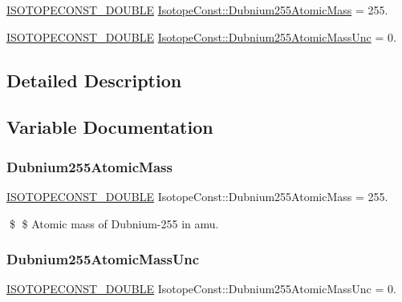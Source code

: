 \begin{DoxyCompactItemize}
\item 
\mbox{\hyperlink{group___isotope_const-_macros_ga8f45a7272ce02c0b4c65c44636ed719a}{I\+S\+O\+T\+O\+P\+E\+C\+O\+N\+S\+T\+\_\+\+D\+O\+U\+B\+LE}} \mbox{\hyperlink{group___isotope_const-_dubnium-_db255_ga06bb51edcc201367d1c122cf9b1c7780}{Isotope\+Const\+::\+Dubnium255\+Atomic\+Mass}} = 255.
\item 
\mbox{\hyperlink{group___isotope_const-_macros_ga8f45a7272ce02c0b4c65c44636ed719a}{I\+S\+O\+T\+O\+P\+E\+C\+O\+N\+S\+T\+\_\+\+D\+O\+U\+B\+LE}} \mbox{\hyperlink{group___isotope_const-_dubnium-_db255_gafa9da578604ad802ebca0f6a1be6fd31}{Isotope\+Const\+::\+Dubnium255\+Atomic\+Mass\+Unc}} = 0.
\end{DoxyCompactItemize}


\subsection{Detailed Description}


\subsection{Variable Documentation}
\mbox{\label{group___isotope_const-_dubnium-_db255_ga06bb51edcc201367d1c122cf9b1c7780}} 
\subsubsection{\texorpdfstring{Dubnium255\+Atomic\+Mass}{Dubnium255AtomicMass}}
{\footnotesize\ttfamily \mbox{\hyperlink{group___isotope_const-_macros_ga8f45a7272ce02c0b4c65c44636ed719a}{I\+S\+O\+T\+O\+P\+E\+C\+O\+N\+S\+T\+\_\+\+D\+O\+U\+B\+LE}} Isotope\+Const\+::\+Dubnium255\+Atomic\+Mass = 255.}

\$ \$ Atomic mass of Dubnium-\/255 in amu. \mbox{\label{group___isotope_const-_dubnium-_db255_gafa9da578604ad802ebca0f6a1be6fd31}} 
\subsubsection{\texorpdfstring{Dubnium255\+Atomic\+Mass\+Unc}{Dubnium255AtomicMassUnc}}
{\footnotesize\ttfamily \mbox{\hyperlink{group___isotope_const-_macros_ga8f45a7272ce02c0b4c65c44636ed719a}{I\+S\+O\+T\+O\+P\+E\+C\+O\+N\+S\+T\+\_\+\+D\+O\+U\+B\+LE}} Isotope\+Const\+::\+Dubnium255\+Atomic\+Mass\+Unc = 0.}


